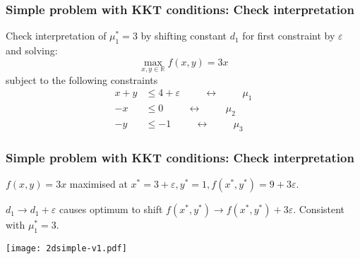 \documentclass[10pt,aspectratio=169,dvipsnames]{beamer}
\def\m{\mu}
\begin{document}
\begin{frame}
  \frametitle{Simple problem with KKT conditions: Check interpretation}

  Check interpretation of $\m_1^* = 3$ by shifting constant $d_1$ for first constraint by $\varepsilon$ and solving:
  \begin{equation*}
    \max_{x,y\in \mathbb{R}} f(x,y) = 3x
  \end{equation*}
  subject to the following constraints
  \begin{align*}
    x + y & \leq 4+ \varepsilon  \hspace{1cm}\leftrightarrow\hspace{1cm} \m_1 \\
    -x & \leq 0  \hspace{1cm}\leftrightarrow\hspace{1cm} \m_2\\
    -y & \leq -1  \hspace{1cm}\leftrightarrow\hspace{1cm} \m_3
  \end{align*}

\end{frame}


\begin{frame}
  \frametitle{Simple problem with KKT conditions: Check interpretation}

  $f(x,y) = 3x$ maximised at $x^* = 3+\varepsilon, y^* = 1, f(x^*, y^*) = 9+3\varepsilon$.

  $d_1 \to d_1 + \varepsilon$ causes optimum to shift $f(x^*, y^*) \to f(x^*, y^*) + 3\varepsilon$. Consistent with $\m_1^* = 3$.

  \centering
  \texttt{[image: 2dsimple-v1.pdf]}

\end{frame}
\end{document}
